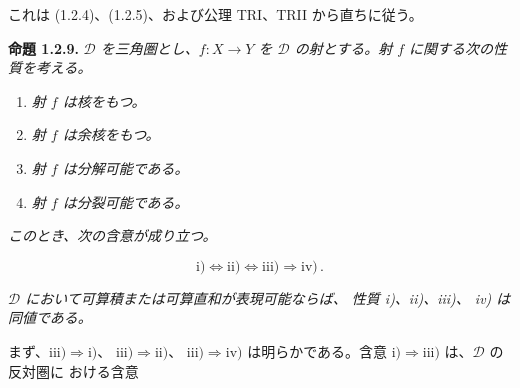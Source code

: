 これは (1.2.4)、(1.2.5)、および公理 TRI、TRII から直ちに従う。

\medskip
\noindent\textbf{命題 1.2.9.}\quad
\emph{$\mathcal D$ を三角圏とし、$f\colon X\longrightarrow Y$ を
$\mathcal D$ の射とする。射 $f$ に関する次の性質を考える。}

\begin{enumerate}
\renewcommand{\labelenumi}{\roman{enumi})}
\item \emph{射 $f$ は核をもつ。}
\item \emph{射 $f$ は余核をもつ。}
\item \emph{射 $f$ は分解可能である。}
\item \emph{射 $f$ は分裂可能である。}
\end{enumerate}

\noindent\emph{このとき、次の含意が成り立つ。}

\[
  \mathrm{i)}\Longleftrightarrow\mathrm{ii)}
  \Longleftrightarrow\mathrm{iii)}\Longrightarrow\mathrm{iv)}\,.
\]

\emph{$\mathcal D$ において可算積または可算直和が表現可能ならば、
性質 \textnormal{i)}、\textnormal{ii)}、\textnormal{iii)}、
\textnormal{iv)} は同値である。}

まず、$\mathrm{iii)}\Longrightarrow\mathrm{i)}$、
$\mathrm{iii)}\Longrightarrow\mathrm{ii)}$、
$\mathrm{iii)}\Longrightarrow\mathrm{iv)}$ は明らかである。含意
$\mathrm{i)}\Longrightarrow\mathrm{iii)}$ は、$\mathcal D$ の反対圏に
おける含意
\endgroup
